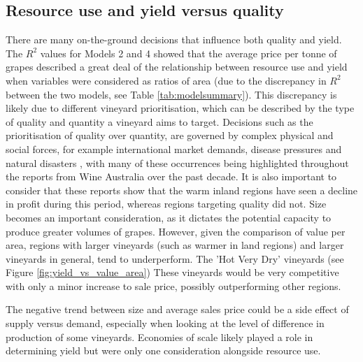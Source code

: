 \documentclass[review,12pt,authoryear]{elsarticle}
\begin{document}
\begin{linenumbers}
\subsection{Resource use and yield versus quality} 
 There are many on-the-ground decisions that influence both quality and yield. The $R^2$ values for Models 2 and 4 showed that the average price per tonne of grapes described a great deal of the relationship between resource use and yield when variables were considered as ratios of area (due to the discrepancy in $R^2$ between the two models, see Table \ref{tab:modelsummary}). This discrepancy is likely due to different vineyard prioritisation, which can be described by the type of quality and quantity a vineyard aims to target. Decisions such as the prioritisation of quality over quantity, are governed by complex physical and social forces, for example international market demands, disease pressures and natural disasters \citep{abadCoverCropsViticulture2021,cortezUsingDataMining2009,hallWithinseasonTemporalVariation2011,i.goodwinManagingSoilWater2009,kasimatiPredictingGrapeSugar2022,oliverReviewSoilPhysical2013,srivastavaNondestructiveSensingMethods2018}, with many of these occurrences being highlighted throughout the reports from Wine Australia \citep{wineaustraliaNationalVintageReport2019,wineaustraliaNationalVintageReport2021,wineaustraliaNationalVintageReport2022,winemakersfederationofaustraliaNationalVintageReport2013,winemakersfederationofaustraliaNationalVintageReport2014,winemakersfederationofaustraliaNationalVintageReport2015,winemakersfederationofaustraliaNationalVintageReport2016,winemakersfederationofaustraliaNationalVintageReport2017,winemakersfederationofaustraliaNationalVintageReport2018} over the past decade. It is also important to consider that these reports show that the warm inland regions have seen a decline in profit during this period, whereas regions targeting quality did not. Size becomes an important consideration, as it dictates the potential capacity to produce greater volumes of grapes. However, given the comparison of value per area, regions with larger vineyards (such as warmer in land regions) and larger vineyards in general, tend to underperform. The 'Hot Very Dry' vineyards (see Figure \ref{fig:yield_vs_value_area}) These vineyards would be very competitive with only a minor increase to sale price, possibly outperforming other regions.
\par
The negative trend between size and average sales price could be a side effect of supply versus demand, especially when looking at the level of difference in production of some vineyards. Economies of scale likely played a role in determining yield but were only one consideration alongside resource use. 

\end{linenumbers}
\end{document}
